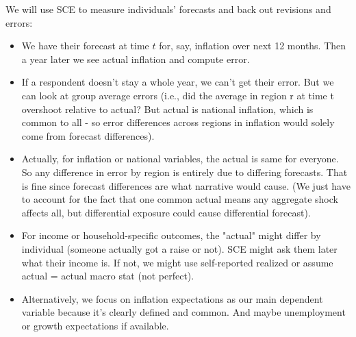 \documentclass[12pt]{article}
\begin{document}
We will use SCE to measure individuals' forecasts and back out revisions and errors:
\begin{itemize}
    \item We have their forecast at time $t$ for, say, inflation over next 12 months. Then a year later we see actual inflation and compute error.
    \item If a respondent doesn't stay a whole year, we can't get their error. But we can look at group average errors (i.e., did the average in region r at time t overshoot relative to actual? But actual is national inflation, which is common to all - so error differences across regions in inflation would solely come from forecast differences).
    \item Actually, for inflation or national variables, the actual is same for everyone. So any difference in error by region is entirely due to differing forecasts. That is fine since forecast differences are what narrative would cause. (We just have to account for the fact that one common actual means any aggregate shock affects all, but differential exposure could cause differential forecast).
    \item For income or household-specific outcomes, the "actual" might differ by individual (someone actually got a raise or not). SCE might ask them later what their income is. If not, we might use self-reported realized or assume actual = actual macro stat (not perfect).
    \item Alternatively, we focus on inflation expectations as our main dependent variable because it's clearly defined and common. And maybe unemployment or growth expectations if available.
\end{itemize}
\end{document}
